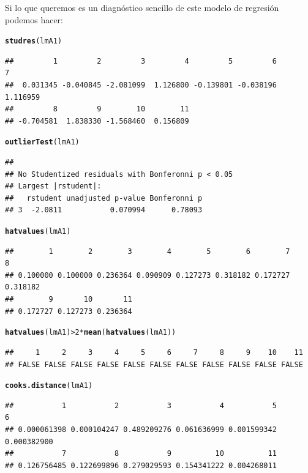 \documentclass[10pt,a4paper]{article}\usepackage[]{graphicx}\usepackage[]{color}
\makeatletter
\newcommand{\hlnum}[1]{\textcolor[rgb]{0.686,0.059,0.569}{#1}}%
\newcommand{\hlopt}[1]{\textcolor[rgb]{0,0,0}{#1}}%
\newcommand{\hlstd}[1]{\textcolor[rgb]{0.345,0.345,0.345}{#1}}%
\newcommand{\hlkwd}[1]{\textcolor[rgb]{0.737,0.353,0.396}{\textbf{#1}}}%
\newenvironment{kframe}{%
 \def\at@end@of@kframe{}%
 \ifinner\ifhmode%
  \def\at@end@of@kframe{\end{minipage}}%
  \begin{minipage}{\columnwidth}%
 \fi\fi%
 \def\FrameCommand##1{\hskip\@totalleftmargin \hskip-\fboxsep
 \colorbox{shadecolor}{##1}\hskip-\fboxsep
     \hskip-\linewidth \hskip-\@totalleftmargin \hskip\columnwidth}%
 \MakeFramed {\advance\hsize-\width
   \@totalleftmargin\z@ \linewidth\hsize
   \@setminipage}}%
 {\par\unskip\endMakeFramed%
 \at@end@of@kframe}
\newenvironment{knitrout}{}{} %
\makeatother
\begin{document}
Si lo que queremos es un diagnóstico sencillo de este modelo de regresión podemos hacer:
\begin{knitrout}
\color{fgcolor}\begin{kframe}
\begin{alltt}
\hlkwd{studres}\hlstd{(lmA1)}
\end{alltt}
\begin{verbatim}
##         1         2         3         4         5         6         7 
##  0.031345 -0.040845 -2.081099  1.126800 -0.139801 -0.038196  1.116959 
##         8         9        10        11 
## -0.704581  1.838330 -1.568460  0.156809
\end{verbatim}
\begin{alltt}
\hlkwd{outlierTest}\hlstd{(lmA1)}
\end{alltt}
\begin{verbatim}
## 
## No Studentized residuals with Bonferonni p < 0.05
## Largest |rstudent|:
##   rstudent unadjusted p-value Bonferonni p
## 3  -2.0811           0.070994      0.78093
\end{verbatim}
\begin{alltt}
\hlkwd{hatvalues}\hlstd{(lmA1)}
\end{alltt}
\begin{verbatim}
##        1        2        3        4        5        6        7        8 
## 0.100000 0.100000 0.236364 0.090909 0.127273 0.318182 0.172727 0.318182 
##        9       10       11 
## 0.172727 0.127273 0.236364
\end{verbatim}
\begin{alltt}
\hlkwd{hatvalues}\hlstd{(lmA1)} \hlopt{>} \hlnum{2} \hlopt{*} \hlkwd{mean}\hlstd{(}\hlkwd{hatvalues}\hlstd{(lmA1))}
\end{alltt}
\begin{verbatim}
##     1     2     3     4     5     6     7     8     9    10    11 
## FALSE FALSE FALSE FALSE FALSE FALSE FALSE FALSE FALSE FALSE FALSE
\end{verbatim}
\begin{alltt}
\hlkwd{cooks.distance}\hlstd{(lmA1)}
\end{alltt}
\begin{verbatim}
##           1           2           3           4           5           6 
## 0.000061398 0.000104247 0.489209276 0.061636999 0.001599342 0.000382900 
##           7           8           9          10          11 
## 0.126756485 0.122699896 0.279029593 0.154341222 0.004268011
\end{verbatim}

\end{kframe}
\end{knitrout}
\end{document}
